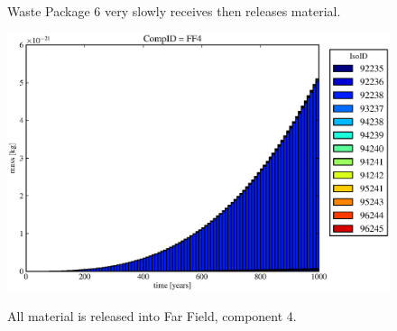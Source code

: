 \begin{figure}[ht]
\begin{minipage}[b]{0.45\linewidth}
  \caption[Case ODI Waste Package Contaminants.]{ 
    Waste Package 6 very slowly receives then releases material. 
    }
  \label{fig:drIVwp6}
  \includegraphics[width=\textwidth]{./chapters/demonstration/base/od0.eps}
  \caption[Case ODI Waste Package Contaminants.]{ 
    All material is released into Far Field, component 4.
    }
  \label{fig:drIVff0}


  \end{minipage}
\end{figure}
